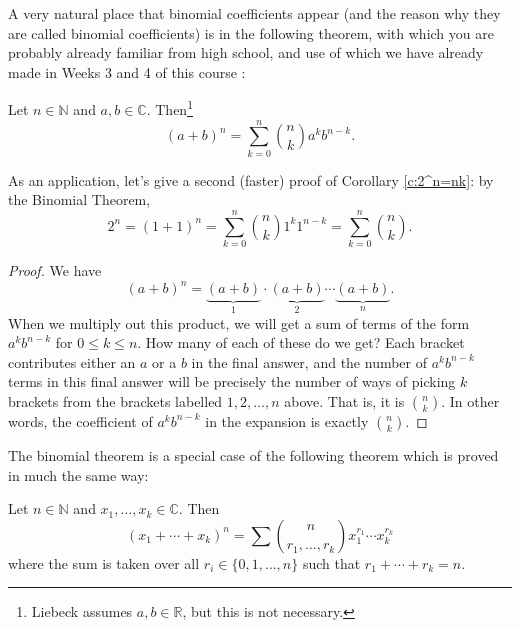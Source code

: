 \documentclass[11pt,dvipsnames]{book}
\numberwithin{equation}{section} %
\numberwithin{figure}{section} %
\numberwithin{table}{section} %
\begin{document}
A very natural place that binomial coefficients appear (and the reason why they are called binomial coefficients) is in the following theorem, with which you are probably already familiar from high school, and use of which we have already made in Weeks 3 and 4 of this course :

\begin{theorem}
Let $n\in\mathbb{N}$ and $a,b\in \mathbb{C}$. Then\footnote{Liebeck assumes $a,b\in \mathbb{R}$, but this is not necessary. }
\begin{equation}
\label{e:binomialtheorem}
(a+b)^{n} = \sum_{k=0}^{n} {n\choose k} a^{k}b^{n-k}. 
\end{equation}
\end{theorem}


As an application, let's give a second (faster) proof of Corollary \ref{c:2^n=nk}: by the Binomial Theorem,
\[
2^{n} = (1+1)^{n} =  \sum_{k=0}^{n} {n\choose k} 1^{k}1^{n-k}=\sum_{k=0}^{n} {n\choose k} .
\]

\begin{proof}
We have
\[ (a+b)^n =  \underbrace{(a + b)}_{1}\cdot \underbrace{(a+b)}_{2}\cdots \underbrace{(a+b)}_{n}.
\]
When we multiply out this product, we will get a sum of terms of the form $a^k b^{n-k}$ for $0 \leq k \leq n$. How many of each of these do we get? Each bracket contributes either an $a$ or a $b$ in the final answer, and the number of $a^k b^{n-k}$ terms 
in this final answer will be precisely the number of ways of picking $k$ brackets from the brackets labelled $1,2 ,\dots , n$ above. That is, it is $n \choose k$. In other words, the coefficient of $a^k b^{n-k}$ in the expansion is exactly  $n \choose k$.
\end{proof}


The binomial theorem is a special case of the following theorem which is proved in much the same way:

\begin{theorem}
Let $n\in\mathbb{N}$ and $x_{1}, \dots ,x_{k}\in \mathbb{C}$. Then 
\begin{equation}
\label{e:multinomialtheorem}
 (x_{1}+\cdots + x_{k})^{n} =
 \sum {n\choose r_{1},\dots ,r_{k}} x_1^{r_{1}}\cdots x_{k}^{r_{k}} 
\end{equation}
where the sum is taken over all $r_{i}\in \{0,1, \dots ,n\}$ such that $r_{1}+\cdots + r_{k}=n$.
\end{theorem}
\end{document}
